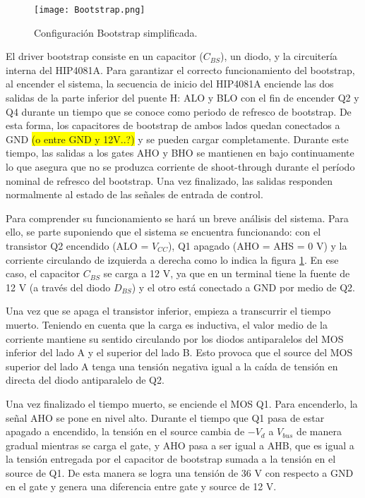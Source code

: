 \begin{figure}[H]
	\centering
	\texttt{[image: Bootstrap.png]}
	\caption{Configuración Bootstrap simplificada.}
	\label{fig:img_bootstrap}
\end{figure}

\noindent El driver bootstrap consiste en un capacitor ($C_{BS}$), un diodo, y la circuitería interna del HIP4081A. Para garantizar el correcto funcionamiento del bootstrap, al encender el sistema, la secuencia de inicio del HIP4081A enciende las dos salidas de la parte inferior del puente H: ALO y BLO con el fin de encender Q2 y Q4 durante un tiempo que se conoce como periodo de refresco de bootstrap. De esta forma, los capacitores de bootstrap de ambos lados quedan conectados a GND \colorbox{yellow}{(o entre GND y 12V..?)} y se pueden cargar completamente. Durante este tiempo, las salidas a los gates AHO y BHO se mantienen en bajo continuamente lo que asegura que no se produzca corriente de shoot-through durante el período nominal de refresco del bootstrap. Una vez finalizado, las salidas responden normalmente al estado de las señales de entrada de control.

\noindent Para comprender su funcionamiento se hará un breve análisis del sistema. Para ello, se parte suponiendo que el sistema se encuentra funcionando: con el transistor Q2 encendido (ALO = $V_{CC}$), Q1 apagado (AHO = AHS = 0 V) y la corriente circulando de izquierda a derecha como lo indica la figura \ref{fig:img_bootstrap}. En ese caso, el capacitor $C_{BS}$ se carga a 12 V, ya que en un terminal tiene la fuente de 12 V (a través del diodo $D_{BS}$) y el otro está conectado a GND por medio de Q2.

\noindent Una vez que se apaga el transistor inferior, empieza a transcurrir el tiempo muerto. Teniendo en cuenta que la carga es inductiva, el valor medio de la corriente mantiene su sentido circulando por los diodos antiparalelos del MOS inferior del lado A y el superior del lado B. Esto provoca que el source del MOS superior del lado A tenga una tensión negativa igual a la caída de tensión en directa del diodo antiparalelo de Q2. 

\noindent Una vez finalizado el tiempo muerto, se enciende el MOS Q1. Para encenderlo, la señal AHO se pone en nivel alto. Durante el tiempo que Q1 pasa de estar apagado a encendido, la tensión en el source cambia de $-V_d$ a $V_{bus}$ de manera gradual mientras se carga el gate, y AHO pasa a ser igual a AHB, que es igual a la tensión entregada por el capacitor de bootstrap sumada a la tensión en el source de Q1. De esta manera se logra una tensión de 36 V con respecto a GND en el gate y genera una diferencia entre gate y source de 12 V.

